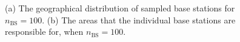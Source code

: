 
\begin{figure}[t]
                        \centering
                \hspace{-0mm}
                        \vspace{-3mm}
                \caption{(a) The geographical distribution of sampled base stations for $n_{\text{BS}} = 100$. (b) The areas that the individual base stations are responsible for, when $n_{\text{BS}} = 100$.}
                \label{fig:BSLocations}
\vspace{-6mm}
\end{figure}












